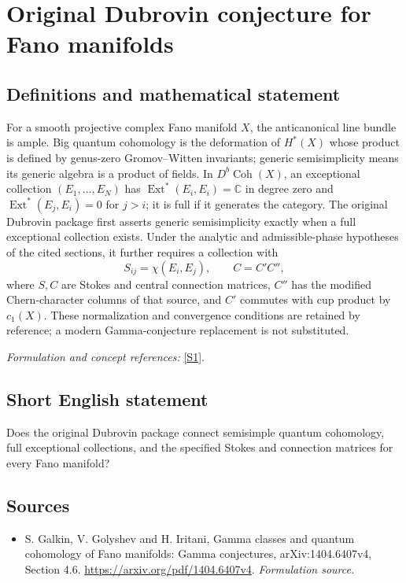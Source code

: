 \documentclass[11pt]{article}
\begin{document}
\section*{\texorpdfstring{Original Dubrovin conjecture for Fano manifolds}{Original Dubrovin conjecture for Fano manifolds}}\label{30006855}
\subsection{Definitions and mathematical statement}
For a smooth projective complex Fano manifold $X$, the anticanonical line bundle is ample. Big quantum cohomology is the deformation of $H^*(X)$ whose product is defined by genus-zero Gromov--Witten invariants; generic semisimplicity means its generic algebra is a product of fields. In $D^b\operatorname{Coh}(X)$, an exceptional collection $(E_1,\ldots,E_N)$ has $\operatorname{Ext}^*(E_i,E_i)={\mathbb{C}}$ in degree zero and $\operatorname{Ext}^*(E_j,E_i)=0$ for $j>i$; it is full if it generates the category. The original Dubrovin package first asserts generic semisimplicity exactly when a full exceptional collection exists. Under the analytic and admissible-phase hypotheses of the cited sections, it further requires a collection with
\[
 S_{ij}=\chi(E_i,E_j),\qquad C=C'C'',
\]
where $S,C$ are Stokes and central connection matrices, $C''$ has the modified Chern-character columns of that source, and $C'$ commutes with cup product by $c_1(X)$. These normalization and convergence conditions are retained by reference; a modern Gamma-conjecture replacement is not substituted.
\par\smallskip\textit{Formulation and concept references:} \href{https://arxiv.org/pdf/1404.6407v4}{[S1]}.

\subsection{Short English statement}
Does the original Dubrovin package connect semisimple quantum cohomology, full exceptional collections, and the specified Stokes and connection matrices for every Fano manifold?
\subsection{Sources}
\begin{itemize}
\item[S1]S. Galkin, V. Golyshev and H. Iritani, Gamma classes and quantum cohomology of Fano manifolds: Gamma conjectures, arXiv:1404.6407v4, Section 4.6.
\url{https://arxiv.org/pdf/1404.6407v4}.
\textit{Formulation source.}
\end{itemize}
\end{document}
